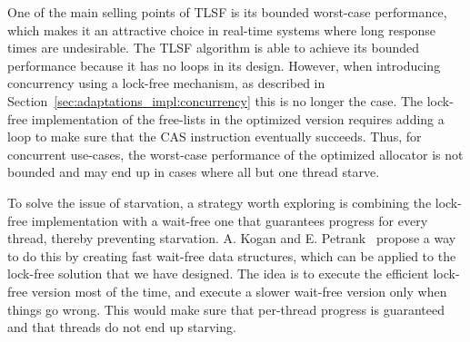 One of the main selling points of TLSF is its bounded worst-case performance, which makes it an attractive choice in real-time systems where long response times are undesirable. The TLSF algorithm is able to achieve its bounded performance because it has no loops in its design. However, when introducing concurrency using a lock-free mechanism, as described in Section~\ref{sec:adaptations_impl:concurrency} this is no longer the case. The lock-free implementation of the free-lists in the optimized version requires adding a loop to make sure that the CAS instruction eventually succeeds. Thus, for concurrent use-cases, the worst-case performance of the optimized allocator is not bounded and may end up in cases where all but one thread starve. 

To solve the issue of starvation, a strategy worth exploring is combining the lock-free implementation with a wait-free one that guarantees progress for every thread, thereby preventing starvation. A. Kogan and E. Petrank~\cite{fast_wait_free} propose a way to do this by creating fast wait-free data structures, which can be applied to the lock-free solution that we have designed. The idea is to execute the efficient lock-free version most of the time, and execute a slower wait-free version only when things go wrong. This would make sure that per-thread progress is guaranteed and that threads do not end up starving.

